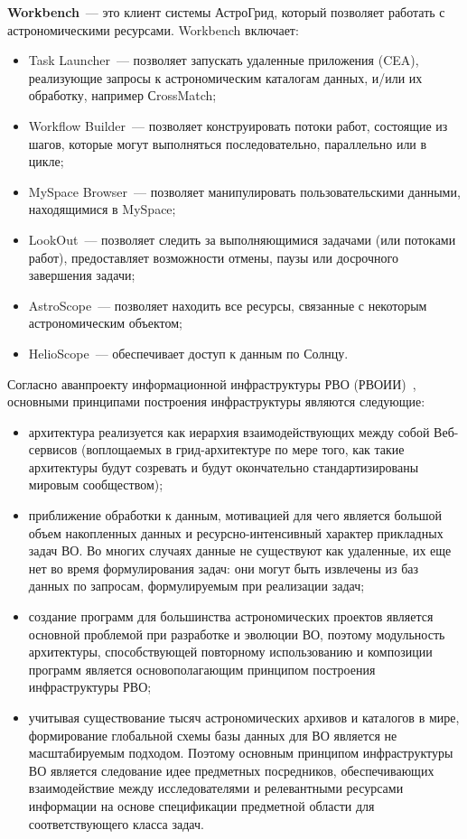 \begin{multicols}{2}
\textbf{Workbench}~--- это клиент системы АстроГрид, который позволяет
работать с астрономическими ресурсами. Workbench включает:
     \begin{itemize}
\item Task Launcher~--- позволяет запускать удаленные приложения (CEA),
реализующие запросы к астрономическим каталогам данных, и/или их обработку,
например СrossMatch;
\item Workflow Builder~--- позволяет конструировать потоки работ, состоящие из
шагов, которые могут выполняться последовательно, параллельно или в цикле;
\item MySpace Browser~--- позволяет манипулировать пользовательскими данными,
находящимися в MySpace;
\item LookOut~--- позволяет следить за вы\-пол\-ня\-ющи\-ми\-ся задачами (или потоками
работ), предо\-став\-ляет возможности отмены, паузы или досрочного завершения
задачи;
\item AstroScope~--- позволяет находить все ресурсы, связанные с некоторым
астрономическим объектом;
\item HelioScope~--- обеспечивает доступ к данным по Солнцу.
\end{itemize}

     Согласно аванпроекту информационной инфраструктуры РВО
(РВОИИ)~\cite{Briu05}, основными принципами построения инфраструктуры являются
следующие:
     \begin{itemize}
\item архитектура реализуется как иерархия взаимодействующих между собой
Веб-сервисов (воплощаемых в грид-архитектуре по мере того, как такие архитектуры
будут созревать и будут окончательно стандартизированы мировым сообществом);
\item приближение обработки к данным, мотивацией для чего является большой объем
накопленных данных и ресурсно-интенсивный характер прикладных задач ВО. Во
многих случаях данные не существуют как удаленные, их еще нет во время
формулирования задач: они могут быть извлечены из баз данных по запросам,
формулируемым при реализации задач;
\item создание программ для большинства астрономических проектов является
основной проблемой при разработке и эволюции ВО, поэтому модульность
архитектуры, способствующей повторному использованию и композиции программ
является основополагающим принципом построения инфраструктуры РВО;
\item учитывая существование тысяч астрономических архивов и каталогов в мире,
формирование глобальной схемы базы данных для ВО является не масштабируемым
подходом. Поэтому основным принципом инфраструктуры ВО является следование
идее предметных посредников, обеспечивающих взаимодействие между
исследователями и релевантными ресурсами информации на основе спецификации
предметной области для соответствующего класса задач.
\end{itemize}


\end{multicols}
